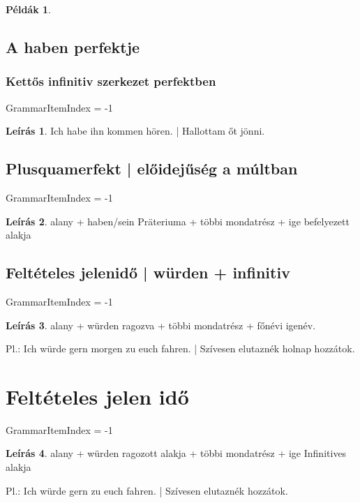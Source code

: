 \documentclass{article}
\theoremstyle{definition}
\newtheorem*{exmp}{Példák}
\newtheorem*{desc}{Leírás}
\begin{document}
\begin{exmp}
\end{exmp}

\subsection{A haben perfektje}


\subsubsection{Kettős infinitiv szerkezet perfektben}

GrammarItemIndex = -1

\begin{desc}
Ich habe ihn kommen hören. | Hallottam őt jönni.
\end{desc}

\subsection{Plusquamerfekt | előidejűség a múltban}

GrammarItemIndex = -1

\begin{desc}
alany + haben/sein Präteriuma + többi mondatrész + ige befelyezett alakja
\end{desc}

\subsection{Feltételes jelenidő | würden + infinitiv}

GrammarItemIndex = -1

\begin{desc}
alany + würden ragozva + többi mondatrész + főnévi igenév.

Pl.: Ich würde gern morgen zu euch fahren. | Szívesen elutaznék holnap hozzátok.
\end{desc}

\section{Feltételes jelen idő}

GrammarItemIndex = -1

\begin{desc}
alany + würden ragozott alakja + többi mondatrész + ige Infinitives alakja

Pl.: Ich würde gern zu euch fahren. | Szívesen elutaznék hozzátok.
\end{desc}
\end{document}
